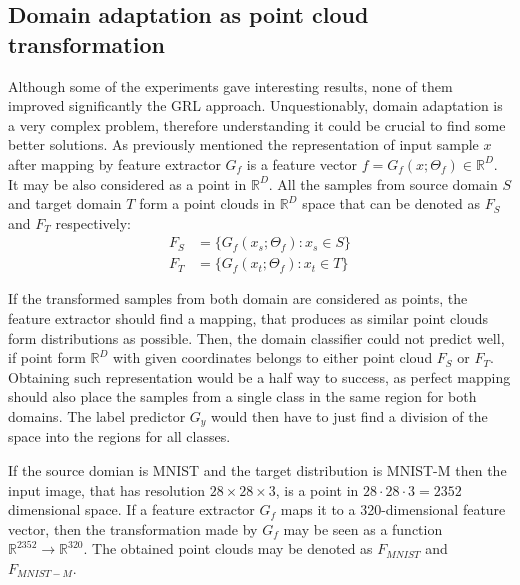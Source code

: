 \documentclass{article}
\begin{document}
\subsection{Domain adaptation as point cloud transformation}
Although some of the experiments gave interesting results, none of them improved significantly the GRL approach. Unquestionably, domain adaptation is a very complex problem, therefore understanding it could be crucial to find some better solutions. As previously mentioned the representation of input sample $x$ after mapping by feature extractor $G_{f}$ is a feature vector $f = G_{f}(x ; \Theta_{f}) \in \mathbb{R}^{D}$. It may be also considered as a point in $\mathbb{R}^{D}$. All the samples from source domain $S$ and target domain $T$ form a point clouds in $\mathbb{R}^{D}$ space that can be denoted as $F_{S}$ and $F_{T}$ respectively:
\begin{align*}
    F_{S} &= \{ G_{f}(x_{s} ; \Theta_{f}) : x_{s} \in S  \} \\
    F_{T} &= \{ G_{f}(x_{t} ; \Theta_{f}) : x_{t} \in T  \}
\end{align*}
\par
If the transformed samples from both domain are considered as points, the feature extractor should find a mapping, that produces as similar point clouds form distributions as possible. Then, the domain classifier could not predict well, if point form $\mathbb{R}^{D}$ with given coordinates belongs to either point cloud $F_{S}$ or $F_{T}$. Obtaining such representation would be a half way to success, as perfect mapping should also place the samples from a single class in the same region for both domains. The label predictor $G_{y}$ would then have to just find a division of the space into the regions for all classes.
\par
If the source domian is MNIST and the target distribution is MNIST-M then the input image, that has resolution $28\times28\times3$, is a point in $28\cdot28\cdot3 = 2352$ dimensional space. If a feature extractor $G_{f}$ maps it to a 320-dimensional feature vector, then the transformation made by $G_{f}$ may be seen as a function $\mathbb{R}^{2352} \rightarrow \mathbb{R}^{320}$. The obtained point clouds may be denoted as $F_{MNIST}$ and $F_{MNIST-M}$.
\end{document}
